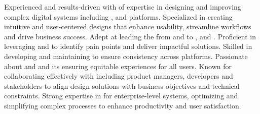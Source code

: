 

\begin{cvparagraph}

Experienced and results-driven  with  of expertise in designing and improving complex digital systems including ,  and  platforms. Specialized in creating intuitive and user-centered designs that enhance usability, streamline workflows and drive business success. Adept at leading the  from  and  to ,  and . Proficient in leveraging  and  to identify pain points and deliver impactful solutions. Skilled in developing and maintaining  to ensure consistency across platforms. Passionate about  and  and its ensuring equitable experiences for all users. Known for collaborating effectively with  including product managers, developers and stakeholders to align design solutions with business objectives and technical constraints. Strong expertise in  for enterprise-level systems, optimizing  and simplifying complex processes to enhance productivity and user satisfaction.

\end{cvparagraph}